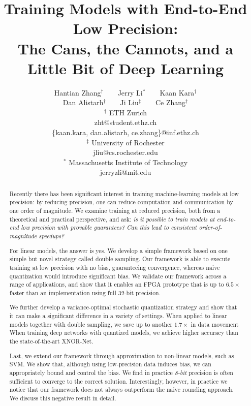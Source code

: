 \documentclass{article}
\title{ \bf
Training Models with End-to-End Low Precision:\\
The Cans, the Cannots, and a Little Bit of Deep Learning
}
\author{
\small Hantian Zhang$^\dag$~~~~Jerry Li$^\ast$~~~~Kaan Kara$^\dag$\\
\small Dan Alistarh$^\dag$~~~~Ji Liu$^\ddag$~~~~Ce Zhang$^\dag$\\
\small $^\dag$ ETH Zurich\\
\small zht@student.ethz.ch\\
\small \{kaan.kara, dan.alistarh, ce.zhang\}@inf.ethz.ch\\
\small $^\ddag$ University of Rochester\\
\small jliu@cs.rochester.edu\\
\small $^\ast$ Massachusetts Institute of Technology\\
\small jerryzli@mit.edu
}
\date{}
\begin{document}
\maketitle

\begin{abstract}

Recently there has been significant interest in training 
machine-learning models at low precision: by reducing 
precision, one can reduce computation and communication by one order of magnitude. 
We examine training at reduced precision, both from a theoretical and practical 
perspective, and ask: 
{\em is it possible to \emph{train} models at end-to-end low 
precision with \emph{provable} guarantees? Can this 
lead to consistent order-of-magnitude speedups?}

For linear models, the answer is yes. We develop a simple 
framework based on one simple but novel strategy called double sampling. 
Our framework is able 
to execute training at low precision with no bias, 
guaranteeing convergence, whereas naive quantization 
would introduce significant bias. We validate our framework   
across a range of applications, and show that it enables an 
FPGA prototype that is up to $6.5\times$ faster 
than an implementation using full 32-bit precision.

We further develop a variance-optimal 
stochastic quantization
strategy and show that 
it can make a significant difference in a variety of settings. 
When applied to linear models together with 
double sampling, we save up to another 
$1.7\times$ in data movement 
When
training deep networks with quantized models, 
we achieve higher accuracy than the state-of-the-art XNOR-Net. 

Last, we extend our framework through approximation to non-linear 
models, such as SVM. We show that, although using low-precision data induces bias, 
we can appropriately 
bound and control the bias. We find in practice {\em 8-bit} 
precision is often sufficient to converge to the correct solution. 
Interestingly, however, in practice we notice that our framework does not always outperform the naive rounding approach. We discuss this negative result in detail. 


\end{abstract}
\end{document}
